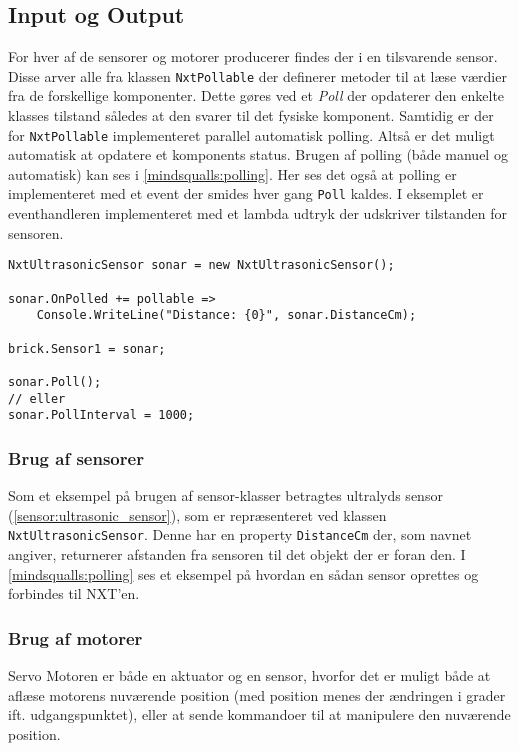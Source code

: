 \subsection{Input og Output}
For hver af de sensorer og motorer \lego producerer findes der i \mindsqualls en tilsvarende sensor.
Disse arver alle fra klassen \lstinline[style=csharp]!NxtPollable! der definerer metoder til at læse værdier fra de forskellige komponenter.
Dette gøres ved et \emph{Poll} der opdaterer den enkelte klasses tilstand således at den svarer til det fysiske komponent.
Samtidig er der for \lstinline[style=csharp]!NxtPollable! implementeret parallel automatisk polling.
Altså er det muligt automatisk at opdatere et komponents status.
Brugen af polling (både manuel og automatisk) kan ses i \cref{mindsqualls:polling}.
Her ses det også at polling er implementeret med et event der smides hver gang \lstinline[style=csharp]!Poll! kaldes.
I eksemplet er eventhandleren implementeret med et lambda udtryk der udskriver tilstanden for sensoren.

\begin{lstlisting}[style=csharpsmall,caption={Et eksempel på polling i \mindsqualls},label=mindsqualls:polling]
NxtUltrasonicSensor sonar = new NxtUltrasonicSensor();

sonar.OnPolled += pollable =>
    Console.WriteLine("Distance: {0}", sonar.DistanceCm);

brick.Sensor1 = sonar;

sonar.Poll();
// eller
sonar.PollInterval = 1000;
\end{lstlisting}

\subsubsection{Brug af sensorer}
Som et eksempel på brugen af sensor-klasser betragtes \legos ultralyds sensor (\cref{sensor:ultrasonic_sensor}), som er repræsenteret ved klassen \lstinline[style=csharp]!NxtUltrasonicSensor!.
Denne har en property \lstinline[style=csharp]!DistanceCm! der, som navnet angiver, returnerer afstanden fra sensoren til det objekt der er foran den.
I \cref{mindsqualls:polling} ses et eksempel på hvordan en sådan sensor oprettes og forbindes til NXT'en.

\subsubsection{Brug af motorer}
\legoms Servo Motoren er både en aktuator og en sensor, hvorfor det er muligt både at aflæse motorens nuværende position (med position menes der ændringen i grader ift. udgangspunktet), eller at sende kommandoer til at manipulere den nuværende position.

